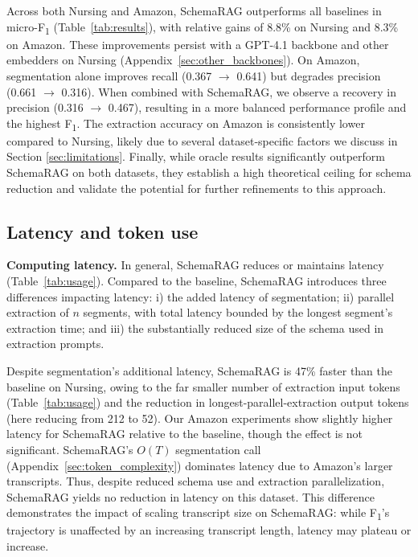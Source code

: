 \documentclass[11pt]{article}
\begin{document}
Across both Nursing and Amazon, SchemaRAG outperforms all baselines in micro-F\textsubscript{1} (Table~\ref{tab:results}), with relative gains of 8.8\% on Nursing and 8.3\% on Amazon. 
These improvements persist with a GPT‑4.1 backbone and other embedders on Nursing (Appendix~\ref{sec:other_backbones}). 
On Amazon, segmentation alone improves recall (0.367 $\to$ 0.641) but degrades precision (0.661 $\to$ 0.316). When combined with SchemaRAG, we observe a recovery in precision (0.316 $\to$ 0.467), resulting in a more balanced performance profile and the highest F\textsubscript{1}.
The extraction accuracy on Amazon is consistently lower compared to Nursing, likely due to several dataset‑specific factors we discuss in Section \ref{sec:limitations}.
Finally, while oracle results significantly outperform SchemaRAG on both datasets, they establish a high theoretical ceiling for schema reduction and validate the potential for further refinements to this approach.


\subsection{Latency and token use}

\textbf{Computing latency.} In general, SchemaRAG reduces or maintains latency (Table~\ref{tab:usage}). Compared to the baseline, SchemaRAG introduces three differences
impacting latency: 
i) the added latency of segmentation;
ii) parallel extraction of $n$ segments, with total latency bounded by the longest segment's extraction time;
and iii)
the substantially reduced size of the schema used in extraction prompts.

Despite segmentation's additional latency, SchemaRAG is 47\% faster than the baseline on Nursing, owing to the far smaller number of extraction input tokens (Table~\ref{tab:usage}) and the reduction in 
longest-parallel-extraction output tokens (here reducing from 212 to 52). 
Our Amazon experiments
show slightly higher latency for SchemaRAG relative to the baseline, though the effect is not significant. SchemaRAG's $O(T)$ segmentation call (Appendix~\ref{sec:token_complexity}) dominates latency due to Amazon's larger transcripts. Thus, despite reduced schema use and extraction parallelization, SchemaRAG yields no reduction in latency on this dataset. This difference demonstrates the impact of scaling transcript size on SchemaRAG: while F\textsubscript{1}'s trajectory is unaffected by an increasing transcript length, latency may plateau or increase.
\end{document}
